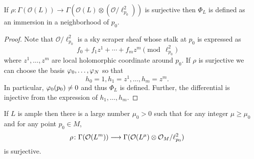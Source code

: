 \documentclass[12pt]{article}
\begin{document}
\begin{lemma}
  If \(\rho\colon\Gamma(\mathcal{O}(L))\to \Gamma(\mathcal{O}(L)\otimes (
  \mathcal{O}/\ell_{p_0}^2))\) is surjective then \(\Phi_L\) is defined as an
  immersion in a neighborhood of \(p_0\).
\end{lemma}
\begin{proof}
  Note that \(\mathcal{O}/\ell_{p_0}^2\) is a sky scraper sheaf whose stalk at
  \(p_0\) is expressed as \[
    f_0+f_1 z^1+\cdots +f_m z^m \pmod{\ell_{p_0}^2}
  \] where \(z^1,\ldots,z^m\) are local holomorphic coordinate around \(p_0\).
  If \(\rho\) is surjective we can choose the basis \(\varphi_0,\ldots,\varphi_N\)
  so that \[
    h_0=1,h_1=z^1,\ldots,h_m=z^m
  .\] In particular, \(\varphi_0(p_0)\neq 0\) and thus \(\Phi_L\) is defined.
  Further, the differential is injective from the expression of
  \(h_1,\ldots,h_m\).
\end{proof}
\begin{lemma}
  If \(L\) is ample then there is a large number \(\mu_0>0\) such that for any
  integer \(\mu\ge \mu_0\) and for any point \(p_0\in M\), \[
    \rho\colon\Gamma(\mathcal{O}(L^m))\longrightarrow \Gamma(\mathcal{O}(L^\mu)\otimes 
    \mathcal{O}_M/\ell_{p_0}^2)
  \] is surjective.
\end{lemma}
\end{document}
